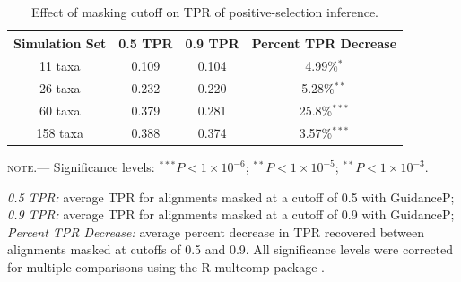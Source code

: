 \documentclass[10pt]{article}
\begin{document}
\begin{table}
\caption {\label{tab:cutoffs} Effect of masking cutoff on TPR of positive-selection inference.}
\begin{tabular}{c c c c}
\hline\noalign{\smallskip}
Simulation Set & 0.5 TPR & 0.9 TPR & Percent TPR Decrease \\ 
\hline\noalign{\smallskip}
11 taxa & 0.109 & 0.104 & 4.99\%$^{\ast}$\\ 
26 taxa & 0.232 & 0.220 & 5.28\%$^{\ast\ast}$\\
60 taxa & 0.379 & 0.281 & 25.8\%$^{\ast\ast\ast}$\\
158 taxa & 0.388 & 0.374  & 3.57\%$^{\ast\ast\ast}$\\
\hline
\end{tabular}
\newline
\textsc{note.}--- Significance levels: $^{\ast\ast\ast} P < 1\times10^{-6}$; $^{\ast\ast} P < 1\times10^{-5}$; $^{\ast\ast} P < 1\times10^{-3}$. 

\textit{0.5 TPR:} average TPR for alignments masked at a cutoff of 0.5 with GuidanceP; \textit{0.9 TPR:} average TPR for alignments masked at a cutoff of 0.9 with GuidanceP; \textit{Percent TPR Decrease:} average percent decrease in TPR recovered between alignments masked at cutoffs of 0.5 and 0.9. All significance levels were corrected for multiple comparisons using the R multcomp package \citep{Hothorn2008}.
\end{table}



	
\end{document}
